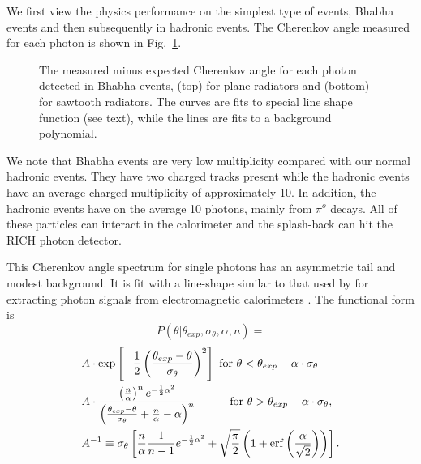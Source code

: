 \documentclass[fleqn,twoside]{article}
\begin{document}
We first view the physics performance on the simplest type of
events, Bhabha events and then subsequently in hadronic events.
The Cherenkov angle measured for each photon is shown in
Fig.~\ref{single_photon}.


\begin{figure} [htb]
\vspace{-.28cm}
\centerline{\hspace{2.75 cm}\epsfxsize
1.24in}
\centerline{\epsfxsize
2.48in} \vspace{-.7cm}
\caption{\label{single_photon} The measured minus expected
      Cherenkov angle for each photon detected in Bhabha events,
      (top) for plane radiators and (bottom) for sawtooth radiators.
      The curves are fits to special line shape function (see text),
      while the lines are fits to a background polynomial.}
\vspace{-0.8cm}\end{figure}

We note that Bhabha events are very low multiplicity compared with
our normal hadronic events. They have two charged tracks present
while the hadronic events have an average charged multiplicity of
approximately 10. In addition, the hadronic events have on the
average 10 photons, mainly from $\pi^o$ decays. All of these
particles can interact in the calorimeter and the splash-back can
hit the RICH photon detector.

This Cherenkov angle spectrum for single photons has an asymmetric tail and modest
background. It is fit with a line-shape similar to that used by
for extracting photon signals from electromagnetic calorimeters
\cite{CBL}. The functional form is
\begin{equation}
P(\theta|\theta_{exp},\sigma_{\theta},\alpha,n)=
\end{equation}
\vspace{-2mm}
\begin{eqnarray*}
&A\cdot{\rm exp}\left[-{1\over 2}\left({{\theta_{exp}-\theta}\over \sigma_{\theta}}
\right)^2\right]~{{\rm for}~\theta<\theta_{exp}-\alpha\cdot\sigma_{\theta}}\\
&A\cdot{{\left({n\over \alpha}\right)^n e^{-{1\over 2}\alpha^2}
\over \left({{\theta_{exp}-\theta}\over \sigma_{\theta}}+{n\over \alpha}-\alpha\right)^n}}
~~~~~~~~~{{\rm for}~\theta>\theta_{exp}-\alpha\cdot\sigma_{\theta}},\\
&A^{-1}\equiv \sigma_{\theta}
\left[{n\over \alpha}{1\over {n-1}}e^{-{1\over 2}\alpha^2}
+\sqrt{\pi\over 2}\left(1+{\rm erf}\left({\alpha\over\sqrt{2}}\right)
\right)\right].
\end{eqnarray*}
\end{document}
